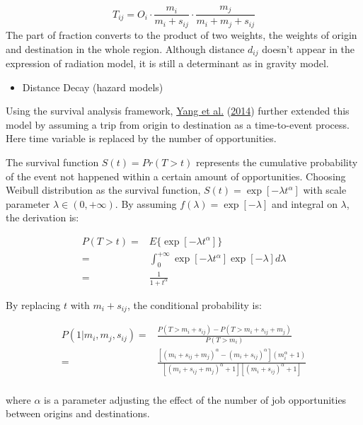 \documentclass[
  11pt,
  openany]{memoir}
\providecommand{\tightlist}{%
  \setlength{\itemsep}{0pt}\setlength{\parskip}{0pt}}
\begin{document}
\[
T_{ij}= O_i\cdot\frac{m_i }{m_i + s_{ij}}\cdot\frac{m_j}{m_i + m_j + s_{ij}}
\] The part of fraction converts to the product of two weights, the weights of origin and destination in the whole region. Although distance \(d_{ij}\) doesn't appear in the expression of radiation model, it is still a determinant as in gravity model.

\begin{itemize}
\tightlist
\item
  Distance Decay (hazard models)
\end{itemize}

Using the survival analysis framework, \protect\hyperlink{ref-yangLimitsPredictabilityCommuting2014}{Yang et al.} (\protect\hyperlink{ref-yangLimitsPredictabilityCommuting2014}{2014}) further extended this model by assuming a trip from origin to destination as a time-to-event process. Here time variable is replaced by the number of opportunities.

The survival function \(S(t)=Pr(T>t)\) represents the cumulative probability of the event not happened within a certain amount of opportunities. Choosing Weibull distribution as the survival function, \(S(t)=\exp[-\lambda t^\alpha]\) with scale parameter \(\lambda \in (0, +\infty)\). By assuming \(f(\lambda)=\exp[-\lambda]\) and integral on \(\lambda\), the derivation is:

\begin{equation}
\label{eq:sf1}
\begin{split}
P(T>t)=&E\{\exp[-\lambda t^\alpha]\} \\ 
=&\int_0^{+\infty}\exp[-\lambda t^\alpha]\exp[-\lambda]d\lambda\\
=&\frac{1}{1+t^{\alpha}}
\end{split}
\end{equation}

By replacing \(t\) with \(m_i+s_{ij}\), the conditional probability is:

\[
\begin{aligned}
P(1|m_i,m_j,s_{ij})= &\frac{P(T>m_i+s_{ij})-P(T> m_i+s_{ij}+m_j)}{P(T>m_i)} \\ 
=&\frac{[(m_i + s_{ij} + m_j)^{\alpha}-(m_i + s_{ij})^{\alpha}](m_i^{\alpha}+1)}{[(m_i + s_{ij} + m_j)^{\alpha}+1][(m_i + s_{ij})^{\alpha}+1]}\\
\end{aligned}
\]

where \(\alpha\) is a parameter adjusting the effect of the number of job opportunities between origins and destinations.
\end{document}
